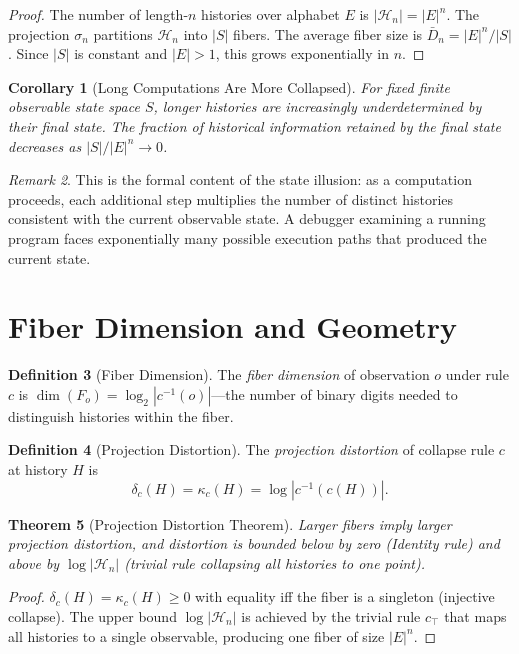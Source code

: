 \documentclass[12pt, a4paper, openany]{book}
\theoremstyle{plain}
\newtheorem{theorem}{Theorem}[chapter]
\newtheorem{corollary}[theorem]{Corollary}
\theoremstyle{definition}
\newtheorem{definition}[theorem]{Definition}
\theoremstyle{remark}
\newtheorem{remark}[theorem]{Remark}
\newcommand{\calH}{\mathcal{H}}
\begin{document}
\begin{proof}
The number of length-$n$ histories over alphabet $E$ is $|\calH_n| = |E|^n$.
The projection $\sigma_n$ partitions $\calH_n$ into $|S|$ fibers.
The average fiber size is $\bar{D}_n = |E|^n / |S|$.
Since $|S|$ is constant and $|E| > 1$, this grows exponentially in $n$.
\end{proof}

\begin{corollary}[Long Computations Are More Collapsed]
For fixed finite observable state space $S$, longer histories are increasingly
underdetermined by their final state. The fraction of historical information
retained by the final state decreases as $|S| / |E|^n \to 0$.
\end{corollary}

\begin{remark}
This is the formal content of the state illusion: as a computation proceeds,
each additional step multiplies the number of distinct histories consistent
with the current observable state. A debugger examining a running program
faces exponentially many possible execution paths that produced the current
state.
\end{remark}

\section{Fiber Dimension and Geometry}

\begin{definition}[Fiber Dimension]
The \emph{fiber dimension} of observation $o$ under rule $c$ is
$\dim(F_o) = \log_2 |c^{-1}(o)|$---the number of binary digits needed to
distinguish histories within the fiber.
\end{definition}

\begin{definition}[Projection Distortion]
The \emph{projection distortion} of collapse rule $c$ at history $H$ is
\[
\delta_c(H) = \kappa_c(H) = \log|c^{-1}(c(H))|.
\]
\end{definition}

\begin{theorem}[Projection Distortion Theorem]
Larger fibers imply larger projection distortion, and distortion is bounded
below by zero (Identity rule) and above by $\log|\calH_n|$ (trivial rule
collapsing all histories to one point).
\end{theorem}

\begin{proof}
$\delta_c(H) = \kappa_c(H) \geq 0$ with equality iff the fiber is a singleton
(injective collapse). The upper bound $\log|\calH_n|$ is achieved by the trivial
rule $c_\top$ that maps all histories to a single observable, producing one
fiber of size $|E|^n$.
\end{proof}
\end{document}
